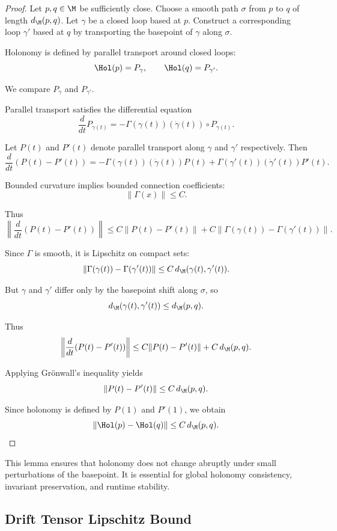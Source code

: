 \begin{proof}
Let $p,q \in \M$ be sufficiently close.  
Choose a smooth path $\sigma$ from $p$ to $q$ of length $d_\M(p,q)$.
Let $\gamma$ be a closed loop based at $p$.  
Construct a corresponding loop $\gamma'$ based at $q$ by transporting the
basepoint of $\gamma$ along $\sigma$.

Holonomy is defined by parallel transport around closed loops:
\[
\Hol(p) = P_\gamma, \qquad \Hol(q) = P_{\gamma'}.
\]

We compare $P_\gamma$ and $P_{\gamma'}$.

Parallel transport satisfies the differential equation
\[
\frac{d}{dt} P_{\gamma(t)}
= -\Gamma(\gamma(t))(\dot{\gamma}(t)) \circ P_{\gamma(t)}.
\]

Let $P(t)$ and $P'(t)$ denote parallel transport along $\gamma$ and
$\gamma'$ respectively. Then
\[
\frac{d}{dt}(P(t) - P'(t))
= -\Gamma(\gamma(t))(\dot{\gamma}(t))P(t)
+ \Gamma(\gamma'(t))(\dot{\gamma}'(t))P'(t).
\]

Bounded curvature implies bounded connection coefficients:
\[
\|\Gamma(x)\| \le C.
\]

Thus
\[
\left\| \frac{d}{dt}(P(t) - P'(t)) \right\|
\le
C \|P(t) - P'(t)\|
+ C \|\Gamma(\gamma(t)) - \Gamma(\gamma'(t))\|.
\]

Since $\Gamma$ is smooth, it is Lipschitz on compact sets:
\[
\|\Gamma(\gamma(t)) - \Gamma(\gamma'(t))\|
\le
C\, d_\M(\gamma(t), \gamma'(t)).
\]

But $\gamma$ and $\gamma'$ differ only by the basepoint shift along
$\sigma$, so
\[
d_\M(\gamma(t), \gamma'(t)) \le d_\M(p,q).
\]

Thus
\[
\left\| \frac{d}{dt}(P(t) - P'(t)) \right\|
\le
C \|P(t) - P'(t)\|
+ C\, d_\M(p,q).
\]

Applying Grönwall’s inequality yields
\[
\|P(t) - P'(t)\|
\le
C\, d_\M(p,q).
\]

Since holonomy is defined by $P(1)$ and $P'(1)$, we obtain
\[
\|\Hol(p) - \Hol(q)\|
\le
C\, d_\M(p,q).
\]
\end{proof}

\begin{remark}
This lemma ensures that holonomy does not change abruptly under small
perturbations of the basepoint. It is essential for global holonomy
consistency, invariant preservation, and runtime stability.
\end{remark}

\subsection{Drift Tensor Lipschitz Bound}

